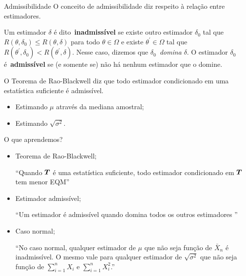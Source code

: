 \begin{frame}{Admissibilidade}
O conceito de admissibilidade diz respeito à relação entre estimadores.
\begin{defn}[Admissibilidade]
 \label{def:admissibility}
 Um estimador $\delta$ é dito~\textbf{inadmissível} se existe outro estimador $\delta_0$ tal que $R(\theta, \delta_0) \leq R(\theta, \delta)$ para todo $\theta \in \Omega$ e existe $\theta^\prime \in \Omega$ tal que $R(\theta^\prime, \delta_0) < R(\theta^\prime, \delta)$.
 Nesse caso, dizemos que $\delta_0$~\textit{domina} $\delta$.
 O estimador $\delta_0$ é~\textbf{admissível} se (e somente se) não há nenhum estimador que o domine.
\end{defn}

\begin{obs}
 O Teorema de Rao-Blackwell diz que todo estimador condicionado em uma estatística suficiente é admissível.
\end{obs}

\begin{exemplo}
\begin{itemize}
 \item Estimando $\mu$ através da mediana amostral;
 \item Estimando $\sqrt{\sigma^2}$.
\end{itemize}
\end{exemplo}

\end{frame}


\begin{frame}{O que aprendemos?}
\begin{itemize}

  \item[\faLightbulbO] Teorema de Rao-Blackwell;    
  
    ``Quando $\boldsymbol{T}$ é uma estatística suficiente, todo estimador condicionado em $\boldsymbol{T}$ tem menor EQM''
    
 \item[\faLightbulbO] Estimador admissível;
 
  ``Um estimador é admissível quando domina todos os outros estimadores ''

 \item[\faLightbulbO] Caso normal;
 
  ``No caso normal, qualquer estimador de $\mu$ que não seja função de $\bar{X}_n$ é inadmissível.
  O mesmo vale para qualquer estimador de $\sqrt{\sigma^2}$ que não seja função de $\sum_{i=1}^n X_i$ e $\sum_{i=1}^n X_i^2$.''
 
 
  \end{itemize}
 \end{frame}

